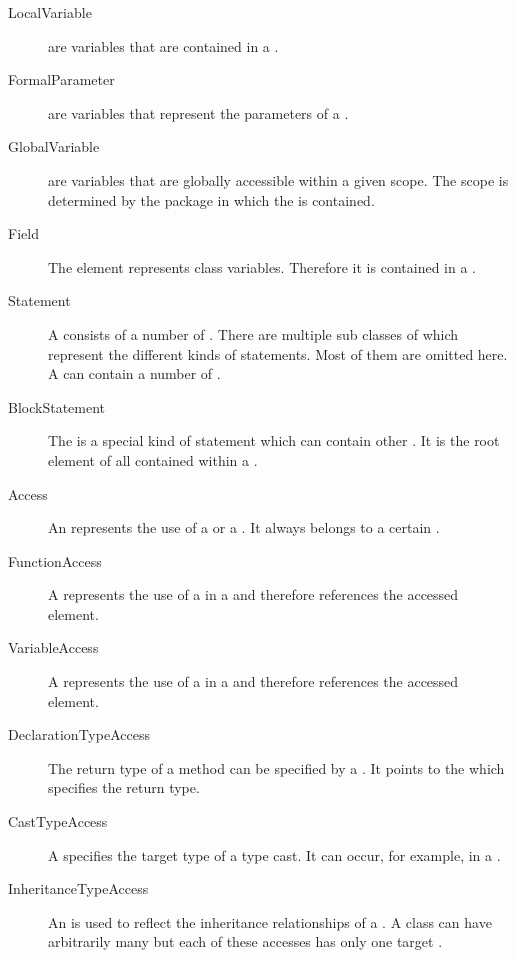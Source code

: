 \begin{description}
\item[LocalVariable]  are variables that are contained in a .
\item[FormalParameter]  are variables that represent the parameters of a .
\item[GlobalVariable]  are variables that are globally accessible within a given scope. The scope is determined by the package in which the  is contained.
\item[Field] The  element represents class variables. Therefore it is contained in a .
\item[Statement] A  consists of a number of . There are multiple sub classes of  which represent the different kinds of statements. Most of them are omitted here. A  can contain a number of .
\item[BlockStatement] The  is a special kind of statement which can contain other . It is the root element of all  contained within a .
\item[Access] An  represents the use of a  or a . It always belongs to a certain .
\item[FunctionAccess] A  represents the use of a  in a  and therefore references the accessed  element.
\item[VariableAccess] A  represents the use of a  in a  and therefore references the accessed  element.
\item[DeclarationTypeAccess] The return type of a method can be specified by a . It points to the  which specifies the return type.
\item[CastTypeAccess] A  specifies the target type of a type cast. It can occur, for example, in a .
\item[InheritanceTypeAccess] An  is used to reflect the inheritance relationships of a . A class can have arbitrarily many  but each of these accesses has only one target .
\end{description}
